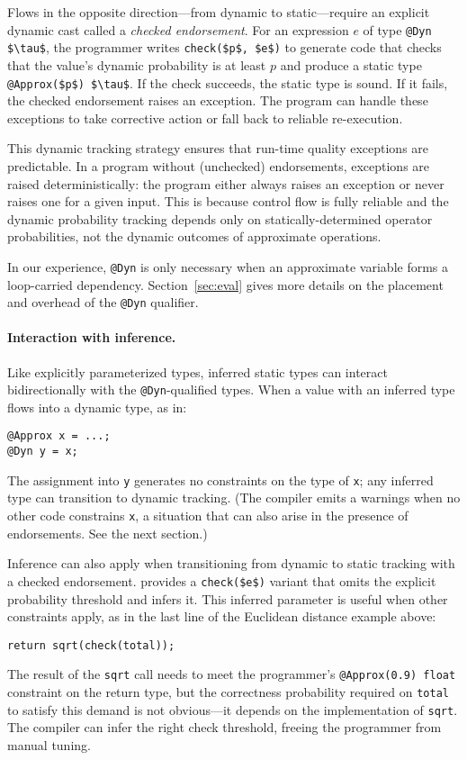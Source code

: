 \documentclass[10pt,nocopyrightspace,preprint]{sigplanconf}
\newcommand{\code}{\lstinline[emphstyle={},keywordstyle={}]}
\begin{document}
Flows in the opposite direction---from dynamic to static---require an explicit
dynamic cast called a \emph{checked endorsement}.
For an expression $e$ of type \code{@Dyn $\tau$}, the programmer writes
\code{check($p$, $e$)} to generate code that checks that the value's
dynamic probability is at least $p$ and produce a static type
\code{@Approx($p$) $\tau$}.
If the check succeeds, the static type is sound.
If it fails, the checked endorsement raises an exception.
The program can handle these exceptions to take corrective action or fall back
to reliable re-execution.

This dynamic tracking strategy ensures that run-time quality exceptions are predictable.
In a program without (unchecked) endorsements, exceptions are raised
deterministically: the program either always raises an exception or never
raises one for a given input.
This is because control flow is fully reliable and the dynamic probability
tracking depends only on statically-determined operator probabilities, not the
dynamic outcomes of approximate operations.

In our experience, \code{@Dyn} is only necessary when an approximate variable
forms a loop-carried dependency.
Section~\ref{sec:eval} gives more details on the placement and overhead of the
\code{@Dyn} qualifier.

\paragraph{Interaction with inference.}
Like explicitly parameterized types, inferred static types can interact bidirectionally
with the \code{@Dyn}-qualified types.
When a value with an inferred type flows into a dynamic type, as in:
%
\begin{lstlisting}
@Approx x = ...;
@Dyn y = x;
\end{lstlisting}
%
The assignment into \code{y} generates no constraints on the type of \code{x};
any inferred type can transition to dynamic tracking.
(The compiler emits a warnings when no other code constrains
\code{x}, a situation that can also arise in the presence of endorsements. See
the next section.)

Inference can also apply when transitioning from dynamic to static tracking
with a checked endorsement.
\lang provides a \code{check($e$)} variant that omits the explicit probability
threshold and infers it.
This inferred parameter is useful when other constraints apply, as in the
last line of the Euclidean distance example above:
%
\begin{lstlisting}
return sqrt(check(total));
\end{lstlisting}
%
The result of the \code{sqrt} call needs to meet the programmer's
\code{@Approx(0.9) float} constraint on the return type, but the correctness
probability required on \code{total} to satisfy this demand is not
obvious---it depends on the implementation of \code{sqrt}.
The compiler can infer the right check threshold, freeing the programmer from
manual tuning.
\end{document}
